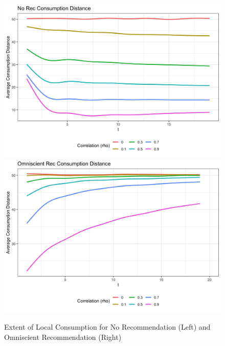 \documentclass[sigconf]{acmart}
\begin{document}
\begin{figure}
\includegraphics[scale=0.1]{figures/consumption_dist_N_200T_20_no_rec_rho}
\includegraphics[scale=0.1]{figures/consumption_dist_N_200T_20_omni_rho}
\caption{Extent of Local Consumption for No Recommendation (Left) and Omniscient Recommendation (Right)}
\label{fig:local_consumption_across_rho}
\end{figure}
\end{document}
